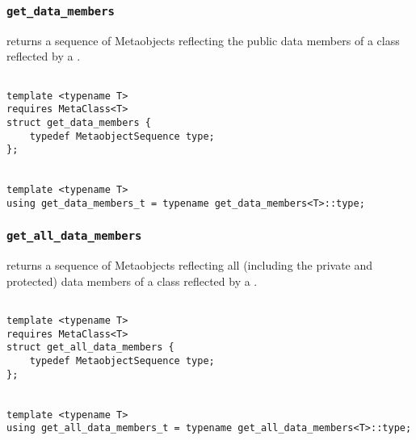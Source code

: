 
\subsubsection{\texttt{get\_data\_members}}

returns a sequence of Metaobjects reflecting the public data members of a class reflected by a .

\begin{verbatim}

template <typename T>
requires MetaClass<T>
struct get_data_members {
	typedef MetaobjectSequence type;
};


template <typename T>
using get_data_members_t = typename get_data_members<T>::type;

\end{verbatim}

\subsubsection{\texttt{get\_all\_data\_members}}

returns a sequence of Metaobjects reflecting all    (including the private and protected)   data members of a class reflected by a .

\begin{verbatim}

template <typename T>
requires MetaClass<T>
struct get_all_data_members {
	typedef MetaobjectSequence type;
};


template <typename T>
using get_all_data_members_t = typename get_all_data_members<T>::type;

\end{verbatim}
